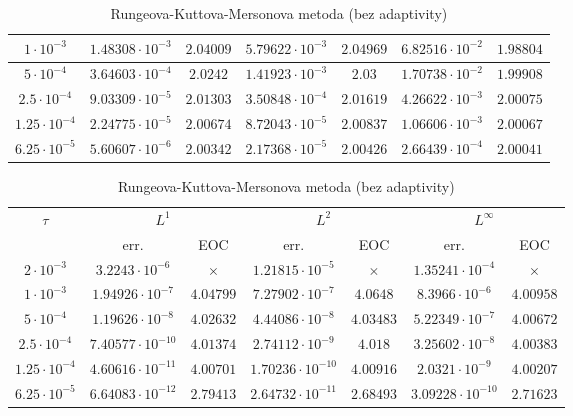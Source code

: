 \documentclass[11pt,american,czech]{article}
\begin{document}
\begin{table}[!htb]
\begin{tabular}{ |c||c|c|c|c|c|c| }
	$1\cdot10^{-3}$ & $1.48308\cdot10^{-3}$ & $2.04009$ & $5.79622\cdot10^{-3}$ & $2.04969$ & $6.82516\cdot10^{-2}$ & $1.98804$ \\ \hline
	$5\cdot10^{-4}$ & $3.64603\cdot10^{-4}$ & $2.0242$ & $1.41923\cdot10^{-3}$ & $2.03$ & $1.70738\cdot10^{-2}$ & $1.99908$  \\ \hline
	$2.5\cdot10^{-4}$ & $9.03309\cdot10^{-5}$ & $2.01303$ & $3.50848\cdot10^{-4}$ & $2.01619$ & $4.26622\cdot10^{-3}$ & $2.00075$  \\ \hline
	$1.25\cdot10^{-4}$ & $2.24775\cdot10^{-5}$ & $2.00674$ & $8.72043\cdot10^{-5}$ & $2.00837$ & $1.06606\cdot10^{-3}$ & $2.00067$  \\ \hline
	$6.25\cdot10^{-5}$ & $5.60607\cdot10^{-6}$ & $2.00342$ & $2.17368\cdot10^{-5}$ & $2.00426$ & $2.66439\cdot10^{-4}$ & $2.00041$  \\ \hline
	\end{tabular}
	\caption{Rungeova-Kuttova metoda 2. řádu}
	\vspace{0.75cm}
	\begin{tabular}{ |c||c|c|c|c|c|c| }
	  \hline

	\multirow{2}{*}{$\tau$} & \multicolumn{2}{c|}{$L^{1}$} & \multicolumn{2}{c|}{$L^{2}$} & \multicolumn{2}{c|}{$L^{\infty}$} \\ \hhline{~------}
	& err. &  EOC & err. & EOC & err. & EOC \\
	  \hline \hline
	$2\cdot10^{-3}$ & $3.2243\cdot10^{-6}$ & $\times$ & $1.21815\cdot10^{-5}$ & $\times$ & $1.35241\cdot10^{-4}$ & $\times$  \\ \hline 
	$1\cdot10^{-3}$ & $1.94926\cdot10^{-7}$ & $4.04799$ & $7.27902\cdot10^{-7}$ & $4.0648$ & $8.3966\cdot10^{-6}$ & $4.00958$ \\ \hline
	$5\cdot10^{-4}$ & $1.19626\cdot10^{-8}$ & $4.02632$ & $4.44086\cdot10^{-8}$ & $4.03483$ & $5.22349\cdot10^{-7}$ & $4.00672$  \\ \hline
	$2.5\cdot10^{-4}$ & $7.40577\cdot10^{-10}$ & $4.01374$ & $2.74112\cdot10^{-9}$ & $4.018$ & $3.25602\cdot10^{-8}$ & $4.00383$  \\ \hline
	$1.25\cdot10^{-4}$ & $4.60616\cdot10^{-11}$ & $4.00701$ & $1.70236\cdot10^{-10}$ & $4.00916$ & $2.0321\cdot10^{-9}$ & $4.00207$  \\ \hline
	$6.25\cdot10^{-5}$ & $6.64083\cdot10^{-12}$ & $2.79413$ & $2.64732\cdot10^{-11}$ & $2.68493$ & $3.09228\cdot10^{-10}$ & $2.71623$  \\ \hline
	\end{tabular}
	\caption{Rungeova-Kuttova-Mersonova metoda (bez adaptivity)}
\end{table}
\end{document}
